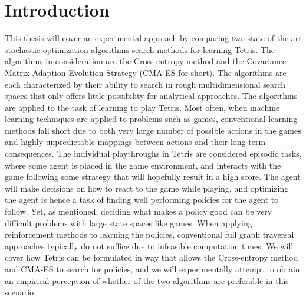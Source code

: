 \section{Introduction \label{sec:intro}}

This thesis will cover an experimental approach 
by comparing two state-of-the-art stochastic optimization algorithms search methods for learning Tetris. 
The algorithms in consideration
are the Cross-entropy method and 
the Covariance Matrix Adaption Evolution Strategy (CMA-ES
for short). The algorithms are each characterized by their
ability to search in rough multidimensional 
search spaces that only offers little possibility 
for analytical approaches.
The algorithms are applied to the task of learning to play Tetris. 
Most often, when machine learning
techniques are applied to problems such as games, conventional
learning methods fall short due to both  very large number of 
possible actions in the games and highly unpredictable mappings 
between actions and their long-term consequences. The individual playthroughs
in Tetris are considered episodic tasks, where some agent is placed
in the game environment, and interacts with the game following some
strategy that will hopefully result in a high score. 
The agent will make decisions on how to react 
to the game while playing, and optimizing the agent is hence a task of
finding well performing policies for the agent to follow. Yet, as mentioned,
deciding what makes a policy good can be very difficult problems 
with large state spaces like games. When applying reinforcement methods to learning
the policies, conventional full graph traversal approaches typically do not suffice 
due to infeasible computation times. We will cover how
Tetris can be formulated in way that allows  the Cross-entropy method 
and CMA-ES to search for policies, and we will experimentally 
attempt to obtain an empirical perception of whether of the two algorithms
are preferable in this scenario.







%


